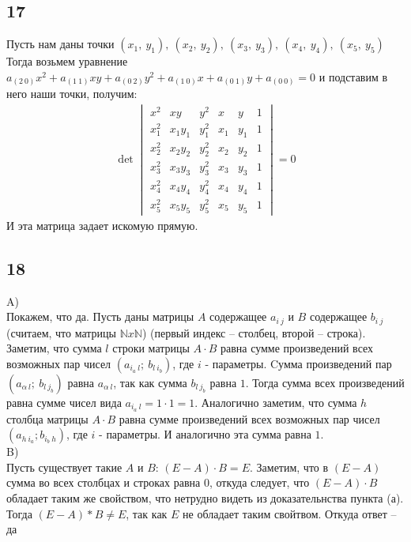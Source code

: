 		\subsection{17}
		Пусть нам даны точки $(x_1,\ y_1),\ (x_2,\ y_2),\ (x_3,\ y_3),\ (x_4,\ y_4),\ (x_5,\ y_5)$\\
		Тогда возьмем уравнение $a_{(2\ 0)} x^2 + a_{(1\ 1)} xy + a_{(0\ 2)} y^2 + a_{(1\ 0)} x + a_{(0\ 1)} y + a_{(0\ 0)} = 0$ и подставим в него наши точки, получим:\\
		\begin{gather}
			\det
			\begin{vmatrix}
				x^2 & xy & y^2 & x & y & 1 \\
				x_1^2 & x_1y_1 & y_1^2 & x_1 & y_1 & 1 \\
				x_2^2 & x_2y_2 & y_2^2 & x_2 & y_2 & 1 \\
				x_3^2 & x_3y_3 & y_3^2 & x_3 & y_3 & 1 \\
				x_4^2 & x_4y_4 & y_4^2 & x_4 & y_4 & 1 \\
				x_5^2 & x_5y_5 & y_5^2 & x_5 & y_5 & 1 
			\end{vmatrix}
			= 0
		\end{gather}
		И эта матрица задает искомую прямую.
		
		\subsection{18}
		A)\\
		Покажем, что да. Пусть даны матрицы $A$ содержащее $a_{i\ j}$ и $B$ содержащее $b_{i\ j}$ (считаем, что матрицы $\mathbb{N} x \mathbb{N}$) (первый индекс -- столбец, второй -- строка).\\ 
		Заметим, что сумма $l$ строки матрицы $A \cdot B$ равна сумме произведений всех возможных пар чисел $(a_{i_a\ l};\ b_{l\ i_b})$, где $i$ - параметры. Cумма произведений пар $(a_{\alpha\ l};\ b_{l\ j_b})$ равна $a_{\alpha\ l}$, так как сумма $b_{l\ j_b}$ равна $1$. Тогда сумма всех произведений равна сумме чисел вида $a_{i_a\ l} = 1 \cdot 1 = 1$. 
		Аналогично заметим, что сумма $h$ столбца матрицы $A \cdot B$ равна сумме произведений всех возможных пар чисел $(a_{h\ i_a};b_{i_b\ h})$, где $i$ - параметры. И аналогично эта сумма равна $1$.
		\\
		B)\\
		Пусть существует такие $A$ и $B$: $(E - A) \cdot B = E$. Заметим, что в $(E - A)$ сумма во всех столбцах и строках равна $0$, откуда следует, что $(E - A) \cdot B$ обладает таким же свойством, что нетрудно видеть из доказательнства пункта (а). Тогда $(E - A)*B \ne E$, так как $E$ не обладает таким свойтвом. Откуда ответ -- да\\
		
